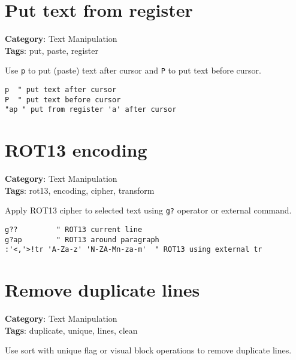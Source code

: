 {{{{{{{{{{{{{\section{Put text from register}

\textbf{Category}: Text Manipulation\\ \textbf{Tags}: put, paste, register
\vspace{0.5cm}

Use {\footnotesize \Verb§p§} to put (paste) text after cursor and {\footnotesize \Verb§P§} to put text before cursor.

\begin{Exa*}{}
\begin{Verbatim}[fontsize=\footnotesize, breaklines, breakanywhere]
p  " put text after cursor
P  " put text before cursor
"ap " put from register 'a' after cursor
\end{Verbatim}
\end{Exa*}

\section{ROT13 encoding}

\textbf{Category}: Text Manipulation\\ \textbf{Tags}: rot13, encoding, cipher, transform
\vspace{0.5cm}

Apply ROT13 cipher to selected text using {\footnotesize \Verb§g?§} operator or external command.

\begin{Exa*}{}
\begin{Verbatim}[fontsize=\footnotesize, breaklines, breakanywhere]
g??         " ROT13 current line
g?ap        " ROT13 around paragraph
:'<,'>!tr 'A-Za-z' 'N-ZA-Mn-za-m'  " ROT13 using external tr
\end{Verbatim}
\end{Exa*}

\section{Remove duplicate lines}

\textbf{Category}: Text Manipulation\\ \textbf{Tags}: duplicate, unique, lines, clean
\vspace{0.5cm}

Use sort with unique flag or visual block operations to remove duplicate lines.

}}}}}}}}}}}}}
